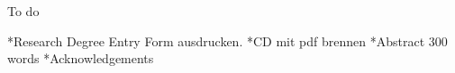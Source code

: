 To do

*Research Degree Entry Form ausdrucken.
*CD mit pdf brennen
*Abstract 300 words
*Acknowledgements


